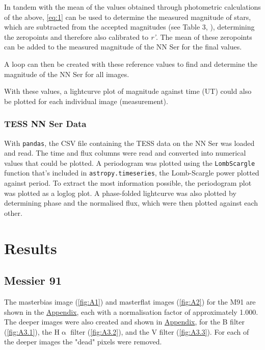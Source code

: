 \documentclass[11pt, a4paper, twocolumn]{article}
\begin{document}
In tandem with the mean of the values obtained through photometric calculations of the above, \autoref{eq:1} can be used to determine the measured magnitude of stars, which are subtracted from the accepted magnitudes (see Table 3, \cite{parsons2010precise}), determining the zeropoints and therefore also calibrated to \textit{r'}. The mean of these zeropoints can be added to the measured magnitude of the NN Ser for the final values.

A loop can then be created with these reference values to find and determine the magnitude of the NN Ser for all images.

With these values, a lightcurve plot of magnitude against time (UT) could also be plotted for each individual image (measurement).

\subsubsection{TESS NN Ser Data}

With \verb|pandas|, the CSV file containing the TESS data on the NN Ser was loaded and read. The time and flux columns were read and converted into numerical values that could be plotted. A periodogram was plotted using the \verb|LombScargle| function that's included in \verb|astropy.timeseries|, the Lomb-Scargle power plotted against period. To extract the most information possible, the periodogram plot was plotted as a loglog plot. A phase-folded lightcurve was also plotted by determining phase and the normalised flux, which were then plotted against each other.

\section{Results} \label{sec:3}

\subsection{Messier 91}

The masterbias image (\autoref{fig:A1}) and masterflat images (\autoref{fig:A2}) for the M91 are shown in the \hyperref[sec:A]{Appendix}, each with a normalisation factor of approximately 1.000. The deeper images were also created and shown in \hyperref[sec:A]{Appendix}, for the B filter (\autoref{fig:A3.1}), the H$\upalpha$ filter (\autoref{fig:A3.2}), and the V filter (\autoref{fig:A3.3}). For each of the deeper images the "dead" pixels were removed.
\end{document}
